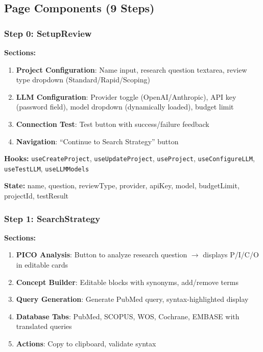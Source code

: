 \documentclass[11pt,a4paper]{article}
\begin{document}
\subsection{Page Components (9 Steps)}

\subsubsection{Step 0: SetupReview}

\textbf{Sections:}
\begin{enumerate}[nosep]
  \item \textbf{Project Configuration}: Name input, research question textarea, review type dropdown (Standard/Rapid/Scoping)
  \item \textbf{LLM Configuration}: Provider toggle (OpenAI/Anthropic), API key (password field), model dropdown (dynamically loaded), budget limit
  \item \textbf{Connection Test}: Test button with success/failure feedback
  \item \textbf{Navigation}: ``Continue to Search Strategy'' button
\end{enumerate}

\textbf{Hooks:} \texttt{useCreateProject}, \texttt{useUpdateProject}, \texttt{useProject}, \texttt{useConfigureLLM}, \texttt{useTestLLM}, \texttt{useLLMModels}

\textbf{State:} name, question, reviewType, provider, apiKey, model, budgetLimit, projectId, testResult

\subsubsection{Step 1: SearchStrategy}

\textbf{Sections:}
\begin{enumerate}[nosep]
  \item \textbf{PICO Analysis}: Button to analyze research question $\to$ displays P/I/C/O in editable cards
  \item \textbf{Concept Builder}: Editable blocks with synonyms, add/remove terms
  \item \textbf{Query Generation}: Generate PubMed query, syntax-highlighted display
  \item \textbf{Database Tabs}: PubMed, SCOPUS, WOS, Cochrane, EMBASE with translated queries
  \item \textbf{Actions}: Copy to clipboard, validate syntax
\end{enumerate}
\end{document}
